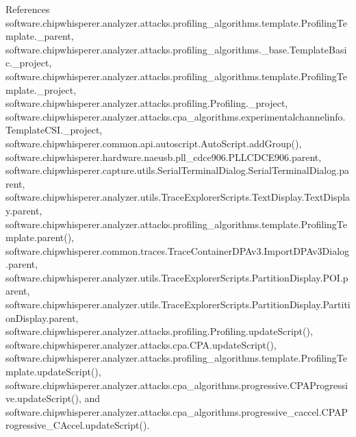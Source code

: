 References software.\+chipwhisperer.\+analyzer.\+attacks.\+profiling\+\_\+algorithms.\+template.\+Profiling\+Template.\+\_\+parent, software.\+chipwhisperer.\+analyzer.\+attacks.\+profiling\+\_\+algorithms.\+\_\+base.\+Template\+Basic.\+\_\+project, software.\+chipwhisperer.\+analyzer.\+attacks.\+profiling\+\_\+algorithms.\+template.\+Profiling\+Template.\+\_\+project, software.\+chipwhisperer.\+analyzer.\+attacks.\+profiling.\+Profiling.\+\_\+project, software.\+chipwhisperer.\+analyzer.\+attacks.\+cpa\+\_\+algorithms.\+experimentalchannelinfo.\+Template\+C\+S\+I.\+\_\+project, software.\+chipwhisperer.\+common.\+api.\+autoscript.\+Auto\+Script.\+add\+Group(), software.\+chipwhisperer.\+hardware.\+naeusb.\+pll\+\_\+cdce906.\+P\+L\+L\+C\+D\+C\+E906.\+parent, software.\+chipwhisperer.\+capture.\+utils.\+Serial\+Terminal\+Dialog.\+Serial\+Terminal\+Dialog.\+parent, software.\+chipwhisperer.\+analyzer.\+utils.\+Trace\+Explorer\+Scripts.\+Text\+Display.\+Text\+Display.\+parent, software.\+chipwhisperer.\+analyzer.\+attacks.\+profiling\+\_\+algorithms.\+template.\+Profiling\+Template.\+parent(), software.\+chipwhisperer.\+common.\+traces.\+Trace\+Container\+D\+P\+Av3.\+Import\+D\+P\+Av3\+Dialog.\+parent, software.\+chipwhisperer.\+analyzer.\+utils.\+Trace\+Explorer\+Scripts.\+Partition\+Display.\+P\+O\+I.\+parent, software.\+chipwhisperer.\+analyzer.\+utils.\+Trace\+Explorer\+Scripts.\+Partition\+Display.\+Partition\+Display.\+parent, software.\+chipwhisperer.\+analyzer.\+attacks.\+profiling.\+Profiling.\+update\+Script(), software.\+chipwhisperer.\+analyzer.\+attacks.\+cpa.\+C\+P\+A.\+update\+Script(), software.\+chipwhisperer.\+analyzer.\+attacks.\+profiling\+\_\+algorithms.\+template.\+Profiling\+Template.\+update\+Script(), software.\+chipwhisperer.\+analyzer.\+attacks.\+cpa\+\_\+algorithms.\+progressive.\+C\+P\+A\+Progressive.\+update\+Script(), and software.\+chipwhisperer.\+analyzer.\+attacks.\+cpa\+\_\+algorithms.\+progressive\+\_\+caccel.\+C\+P\+A\+Progressive\+\_\+\+C\+Accel.\+update\+Script().


